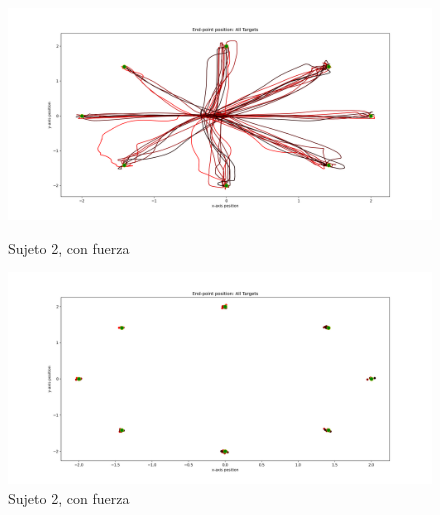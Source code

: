 \documentclass[a4paper,11pt, oneside]{book}
\begin{document}
\begin{figure}[H]
	\begin{minipage}[b]{0.5\linewidth}
		\centering
		\includegraphics[width=\linewidth]{sujeto2/force/trayectorias}
		\caption{Sujeto 2, con fuerza}
		\label{2-fase2-1}
	\end{minipage}
	\hspace{0.5cm}
	\begin{minipage}[b]{0.5\linewidth}
		\centering
		\includegraphics[width=\linewidth]{sujeto2/force/trayectorias_puntos}
		\caption{Sujeto 2, con fuerza}
		\label{2-fase2-2}
	\end{minipage}
\end{figure}
\end{document}
